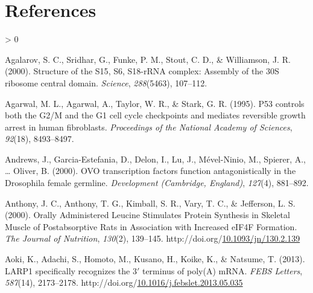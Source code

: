 \documentclass[12pt,oneside]{reedthesis}
\newlength{\cslhangindent}
\newenvironment{CSLReferences}[2] %
 {%
  \setlength{\parindent}{0pt}
  \ifodd #1 \everypar{\setlength{\hangindent}{\cslhangindent}}\ignorespaces\fi
  \ifnum #2 > 0
  \setlength{\parskip}{#2\baselineskip}
  \fi
 }%
 {}
\begin{document}
\backmatter

\hypertarget{references}{%
\chapter*{References}\label{references}}


\noindent

\setlength{\parindent}{-0.20in}
\setlength{\leftskip}{0.20in}
\setlength{\parskip}{8pt}

\hypertarget{refs}{}
\begin{CSLReferences}{1}{0}
\leavevmode\hypertarget{ref-Agalarov2000}{}%
Agalarov, S. C., Sridhar, G., Funke, P. M., Stout, C. D., \& Williamson, J. R. (2000). Structure of the {S15}, {S6}, {S18}-{rRNA} complex: Assembly of the {30S} ribosome central domain. \emph{Science}, \emph{288}(5463), 107--112.

\leavevmode\hypertarget{ref-Agarwal1995a}{}%
Agarwal, M. L., Agarwal, A., Taylor, W. R., \& Stark, G. R. (1995). P53 controls both the {G2}/{M} and the {G1} cell cycle checkpoints and mediates reversible growth arrest in human fibroblasts. \emph{Proceedings of the National Academy of Sciences}, \emph{92}(18), 8493--8497.

\leavevmode\hypertarget{ref-Andrews2000a}{}%
Andrews, J., Garcia-Estefania, D., Delon, I., Lu, J., Mével-Ninio, M., Spierer, A., \ldots{} Oliver, B. (2000). {OVO} transcription factors function antagonistically in the {Drosophila} female germline. \emph{Development (Cambridge, England)}, \emph{127}(4), 881--892.

\leavevmode\hypertarget{ref-anthonyOrallyAdministeredLeucine2000}{}%
Anthony, J. C., Anthony, T. G., Kimball, S. R., Vary, T. C., \& Jefferson, L. S. (2000). Orally {Administered Leucine Stimulates Protein Synthesis} in {Skeletal Muscle} of {Postabsorptive Rats} in {Association} with {Increased eIF4F Formation}. \emph{The Journal of Nutrition}, \emph{130}(2), 139--145. http://doi.org/\href{https://doi.org/10.1093/jn/130.2.139}{10.1093/jn/130.2.139}

\leavevmode\hypertarget{ref-aokiLARP1SpecificallyRecognizes2013}{}%
Aoki, K., Adachi, S., Homoto, M., Kusano, H., Koike, K., \& Natsume, T. (2013). {LARP1} specifically recognizes the 3{\({'}\)} terminus of poly({A}) {mRNA}. \emph{FEBS Letters}, \emph{587}(14), 2173--2178. http://doi.org/\href{https://doi.org/10.1016/j.febslet.2013.05.035}{10.1016/j.febslet.2013.05.035}


\end{CSLReferences}
\end{document}
